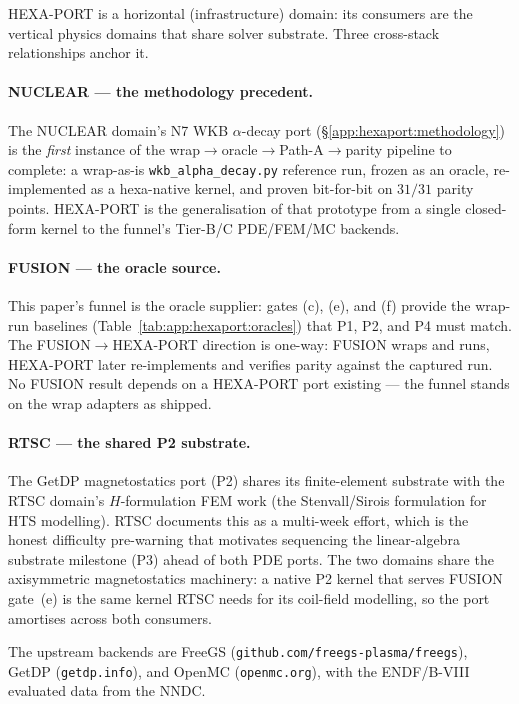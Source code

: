 HEXA-PORT is a horizontal (infrastructure) domain: its consumers are
the vertical physics domains that share solver substrate. Three
cross-stack relationships anchor it.

\paragraph{NUCLEAR --- the methodology precedent.} The NUCLEAR domain's
N7 WKB $\alpha$-decay port (\S\ref{app:hexaport:methodology}) is the
\emph{first} instance of the
wrap$\rightarrow$oracle$\rightarrow$Path-A$\rightarrow$parity pipeline
to complete: a wrap-as-is \texttt{wkb\_alpha\_decay.py} reference run,
frozen as an oracle, re-implemented as a hexa-native kernel, and proven
bit-for-bit on $31/31$ parity points. HEXA-PORT is the generalisation of
that prototype from a single closed-form kernel to the funnel's Tier-B/C
PDE/FEM/MC backends.

\paragraph{FUSION --- the oracle source.} This paper's funnel is the
oracle supplier: gates (c), (e), and (f) provide the wrap-run baselines
(Table~\ref{tab:app:hexaport:oracles}) that P1, P2, and P4 must match.
The FUSION$\rightarrow$HEXA-PORT direction is one-way: FUSION wraps and
runs, HEXA-PORT later re-implements and verifies parity against the
captured run. No FUSION result depends on a HEXA-PORT port existing ---
the funnel stands on the wrap adapters as shipped.

\paragraph{RTSC --- the shared P2 substrate.} The GetDP magnetostatics
port (P2) shares its finite-element substrate with the RTSC domain's
$H$-formulation FEM work (the Stenvall/Sirois formulation for HTS
modelling). RTSC documents this as a multi-week effort, which is the
honest difficulty pre-warning that motivates sequencing the
linear-algebra substrate milestone (P3) ahead of both PDE ports. The
two domains share the axisymmetric magnetostatics machinery: a native
P2 kernel that serves FUSION gate~(e) is the same kernel RTSC needs for
its coil-field modelling, so the port amortises across both consumers.

The upstream backends are FreeGS
(\texttt{github.com/freegs-plasma/freegs}), GetDP
(\texttt{getdp.info}), and OpenMC (\texttt{openmc.org}), with the
ENDF/B-VIII evaluated data from the NNDC.

